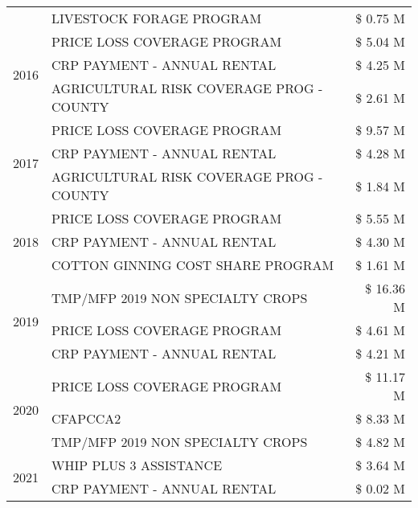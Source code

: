 \begin{tabular}{llr}
 & LIVESTOCK FORAGE PROGRAM & \$ 0.75 M \\
\cline{1-3}
\multirow[t]{3}{*}{2016} & PRICE LOSS COVERAGE PROGRAM & \$ 5.04 M \\
 & CRP PAYMENT - ANNUAL RENTAL & \$ 4.25 M \\
 & AGRICULTURAL RISK COVERAGE PROG - COUNTY & \$ 2.61 M \\
\cline{1-3}
\multirow[t]{3}{*}{2017} & PRICE LOSS COVERAGE PROGRAM & \$ 9.57 M \\
 & CRP PAYMENT - ANNUAL RENTAL & \$ 4.28 M \\
 & AGRICULTURAL RISK COVERAGE PROG - COUNTY & \$ 1.84 M \\
\cline{1-3}
\multirow[t]{3}{*}{2018} & PRICE LOSS COVERAGE PROGRAM & \$ 5.55 M \\
 & CRP PAYMENT - ANNUAL RENTAL & \$ 4.30 M \\
 & COTTON GINNING COST SHARE PROGRAM & \$ 1.61 M \\
\cline{1-3}
\multirow[t]{3}{*}{2019} & TMP/MFP 2019 NON SPECIALTY CROPS & \$ 16.36 M \\
 & PRICE LOSS COVERAGE PROGRAM & \$ 4.61 M \\
 & CRP PAYMENT - ANNUAL RENTAL & \$ 4.21 M \\
\cline{1-3}
\multirow[t]{3}{*}{2020} & PRICE LOSS COVERAGE PROGRAM & \$ 11.17 M \\
 & CFAPCCA2 & \$ 8.33 M \\
 & TMP/MFP 2019 NON SPECIALTY CROPS & \$ 4.82 M \\
\cline{1-3}
\multirow[t]{2}{*}{2021} & WHIP PLUS 3 ASSISTANCE & \$ 3.64 M \\
 & CRP PAYMENT - ANNUAL RENTAL & \$ 0.02 M \\
\cline{1-3}
\bottomrule
\end{tabular}
